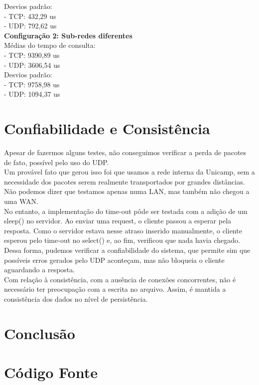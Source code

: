 \documentclass[11pt,twoside]{article}
\begin{document}
Desvios padrão:\\
- TCP: 432,29 us\\
- UDP: 792,62 us\\

\textbf{Configuração 2: Sub-redes diferentes}\\
Médias do tempo de consulta:\\
- TCP: 9390,89 us\\
- UDP: 3606,54 us\\

Desvios padrão:\\
- TCP: 9758,98 us\\
- UDP: 1094,37 us\\


\section{Confiabilidade e Consistência}
Apesar de fazermos alguns testes, não conseguimos verificar a perda de pacotes de fato, possível pelo uso do UDP.\\
Um provável fato que gerou isso foi que usamos a rede interna da Unicamp, sem a necessidade dos pacotes serem realmente transportados por grandes distâncias. Não podemos dizer que testamos apenas numa LAN, mas também não chegou a uma WAN.\\
No entanto, a implementação do time-out pôde ser testada com a adição de um sleep() no servidor. Ao enviar uma request, o cliente passou a esperar pela resposta. Como o servidor estava nesse atraso inserido manualmente, o cliente esperou pelo time-out no select() e, ao fim, verificou que nada havia chegado.\\
Dessa forma, pudemos verificar a confiabilidade do sistema, que permite sim que possíveis erros gerados pelo UDP aconteçam, mas não bloqueia o cliente aguardando a resposta.\\
Com relação à consistência, com a ausência de conexões concorrentes, não é necessário ter preocupação com a escrita no arquivo. Assim, é mantida a consistência dos dados no nível de persistência.\\

\section{Conclusão}

\section{Código Fonte}
\end{document}

